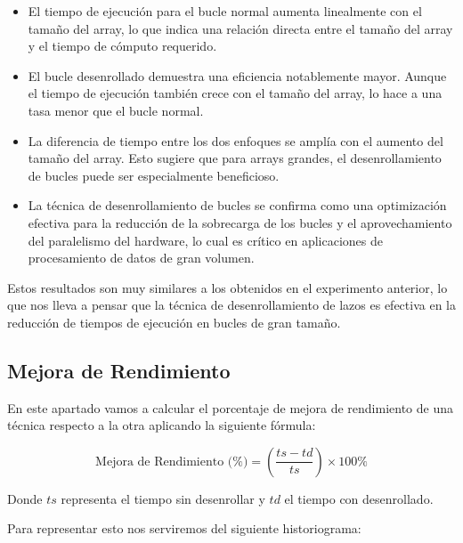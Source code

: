 \documentclass[a4paper,twocolumn]{article}
\begin{document}
\begin{itemize}
    \item El tiempo de ejecución para el bucle normal aumenta linealmente con el tamaño del array, lo que indica una relación directa entre el tamaño del array y el tiempo de cómputo requerido.
    \item El bucle desenrollado demuestra una eficiencia notablemente mayor. Aunque el tiempo de ejecución también crece con el tamaño del array, lo hace a una tasa menor que el bucle normal.
    \item La diferencia de tiempo entre los dos enfoques se amplía con el aumento del tamaño del array. Esto sugiere que para arrays grandes, el desenrollamiento de bucles puede ser especialmente beneficioso.
    \item La técnica de desenrollamiento de bucles se confirma como una optimización efectiva para la reducción de la sobrecarga de los bucles y el aprovechamiento del paralelismo del hardware, lo cual es crítico en aplicaciones de procesamiento de datos de gran volumen.
\end{itemize}

Estos resultados son muy similares a los obtenidos en el experimento anterior, lo que nos lleva a pensar que la técnica de desenrollamiento de lazos es efectiva en la reducción de tiempos de ejecución en bucles de gran tamaño.

\subsection{Mejora de Rendimiento}

En este apartado vamos a calcular el porcentaje de mejora de rendimiento de una técnica respecto a la otra aplicando la siguiente fórmula:

\begin{equation}
    \text{Mejora de Rendimiento (\%)} = \left( \frac{ts - td}{ts} \right) \times 100\%
\end{equation}

Donde \( ts \) representa el tiempo sin desenrollar y \( td \) el tiempo con desenrollado. 

Para representar esto nos serviremos del siguiente historiograma:   
\end{document}
